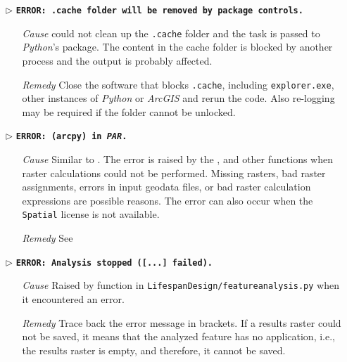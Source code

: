 \begin{itemize}
	\item[$\triangleright$] \textbf{\texttt{ERROR: .cache folder will be removed by package controls.}}
	\begin{itemize}
		\item[\textit{Cause}\hspace{0.27cm}]  could not clean up the \texttt{.cache} folder and the task is passed to \textit{Python}'s  package. The content in the cache folder is blocked by another process and the output is probably affected.
		\item[\textit{Remedy}] Close the software that blocks \texttt{.cache}, including \texttt{explorer.exe}, other instances of \textit{Python} or \textit{ArcGIS} and rerun the code. Also re-logging may be required if the folder cannot be unlocked.\\
	\end{itemize}
	
	\item[$\triangleright$]\textbf{\texttt{ERROR: (arcpy) in \textit{PAR}.}}
	\begin{itemize}
		\item[\textit{Cause}\hspace{0.27cm}] Similar to . The error is raised by the ,  and other functions when  raster calculations could not be performed. Missing rasters, bad raster assignments, errors in input geodata files, or bad raster calculation expressions are possible reasons. The error can also occur when the \texttt{Spatial} license is not available.
		\item[\textit{Remedy}] See \\
	\end{itemize}
	
	\item[$\triangleright$]\textbf{\texttt{ERROR: Analysis stopped ([...] failed).}}
	\begin{itemize}
		\item[\textit{Cause}\hspace{0.27cm}] Raised by  function in \texttt{LifespanDesign/feature{\myUnderscore}analysis.py} when it encountered an error.
		\item[\textit{Remedy}] Trace back the error message in brackets. If a results raster could not be saved, it means that the analyzed feature has no application, i.e., the results raster is empty, and therefore, it cannot be saved.\\
	\end{itemize}
	

\end{itemize}
